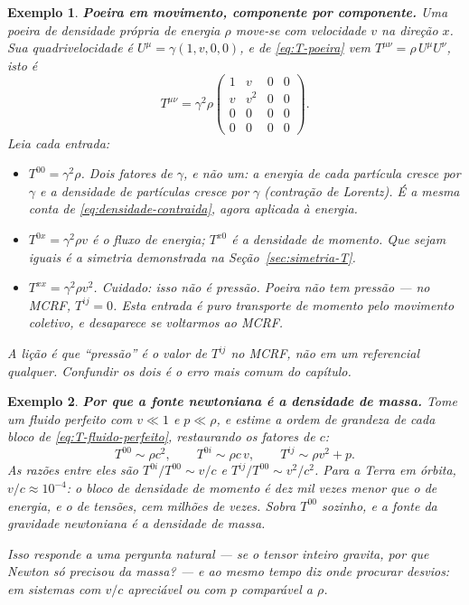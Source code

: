 \documentclass[12pt,a4paper,oneside]{book}
\theoremstyle{rgplain}
\newtheorem{example}{Exemplo}[chapter]
\theoremstyle{rgremark}
\begin{document}
\begin{example}
\textbf{Poeira em movimento, componente por componente.} Uma poeira de
densidade própria de energia $\rho$ move-se com velocidade $v$ na direção
$x$. Sua quadrivelocidade é $U^\mu=\gamma(1,v,0,0)$, e de
\eqref{eq:T-poeira} vem $T^{\mu\nu}=\rho\,U^\mu U^\nu$, isto é
\[
  T^{\mu\nu}=\gamma^2\rho
  \begin{pmatrix}
    1 & v & 0 & 0\\ v & v^2 & 0 & 0\\ 0&0&0&0\\ 0&0&0&0
  \end{pmatrix} .
\]
Leia cada entrada:
\begin{itemize}
  \item $T^{00}=\gamma^2\rho$. Dois fatores de $\gamma$, e não um: a energia
  de cada partícula cresce por $\gamma$ \emph{e} a densidade de partículas
  cresce por $\gamma$ (contração de Lorentz). É a mesma conta de
  \eqref{eq:densidade-contraida}, agora aplicada à energia.
  \item $T^{0x}=\gamma^2\rho v$ é o fluxo de energia; $T^{x0}$ é a densidade
  de momento. Que sejam iguais é a simetria demonstrada na
  Seção~\ref{sec:simetria-T}.
  \item $T^{xx}=\gamma^2\rho v^2$. Cuidado: isso \emph{não} é pressão. Poeira
  não tem pressão --- no MCRF, $T^{ij}=0$. Esta entrada é puro transporte de
  momento pelo movimento coletivo, e desaparece se voltarmos ao MCRF.
\end{itemize}
A lição é que ``pressão'' é o valor de $T^{ij}$ \emph{no MCRF}, não em um
referencial qualquer. Confundir os dois é o erro mais comum do capítulo.
\end{example}

\begin{example}
\textbf{Por que a fonte newtoniana é a densidade de massa.} Tome um fluido
perfeito com $v\ll1$ e $p\ll\rho$, e estime a ordem de grandeza de cada bloco
de \eqref{eq:T-fluido-perfeito}, restaurando os fatores de $c$:
\[
  T^{00}\sim\rho c^2,\qquad
  T^{0i}\sim\rho c\,v,\qquad
  T^{ij}\sim\rho v^2+p .
\]
As razões entre eles são $T^{0i}/T^{00}\sim v/c$ e
$T^{ij}/T^{00}\sim v^2/c^2$. Para a Terra em órbita, $v/c\approx10^{-4}$: o
bloco de densidade de momento é dez mil vezes menor que o de energia, e o de
tensões, cem milhões de vezes. Sobra $T^{00}$ sozinho, e a fonte da gravidade
newtoniana é a densidade de massa.

Isso responde a uma pergunta natural --- se o tensor inteiro gravita, por que
Newton só precisou da massa? --- e ao mesmo tempo diz onde procurar desvios:
em sistemas com $v/c$ apreciável ou com $p$ comparável a $\rho$.
\end{example}
\end{document}
